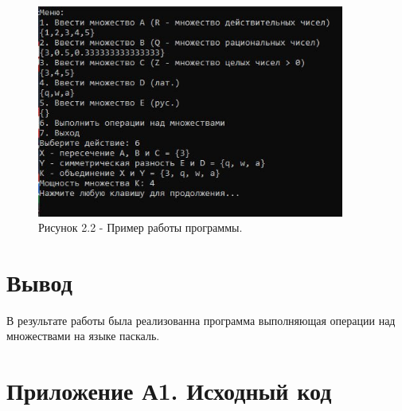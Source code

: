 \documentclass[oneside,a4paper,14pt]{extarticle}
\begin{document}
\begin{figure}[H]
	\centering
	\includegraphics[width=0.9\textwidth]{pics/photo2.jpg}
	\caption*{Рисунок 2.2 - Пример работы программы.}
\end{figure}

\section*{Вывод}


В результате работы была реализованна программа выполняющая операции над множествами на языке паскаль.
\newpage
\section*{Приложение А1. Исходный код}
\inputminted{pascal}{code/main.pas}
\end{document}

